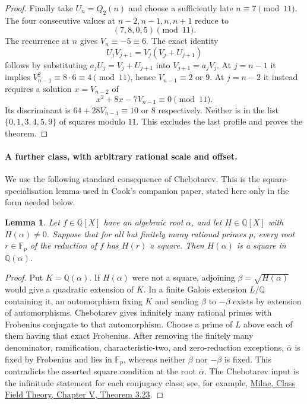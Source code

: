 \documentclass[11pt]{article}
\newtheorem{lemma}{Lemma}
\begin{document}
\begin{proof}
Finally take $U_n=Q_2(n)$ and choose a sufficiently late $n\equiv7\pmod{11}$.
The four consecutive values at $n-2,n-1,n,n+1$ reduce to
\[
 (7,8,0,5)\pmod{11}.
\]
The recurrence at $n$ gives $V_n\equiv-5\equiv6$. The exact identity
\begin{equation}\label{eq:Didentity}
 U_j V_{j+1}=V_j(V_j+U_{j+1})
\end{equation}
follows by substituting $a_jU_j=V_j+U_{j+1}$ into
$V_{j+1}=a_jV_j$. At $j=n-1$ it implies
$V_{n-1}^2\equiv8\cdot6\equiv4\pmod{11}$, hence
$V_{n-1}\equiv2$ or $9$. At $j=n-2$ it instead requires a solution $x=V_{n-2}$ of
\[
 x^2+8x-7V_{n-1}\equiv0\pmod{11}.
\]
Its discriminant is $64+28V_{n-1}\equiv10$ or $8$ respectively.
Neither is in the list $\{0,1,3,4,5,9\}$ of squares modulo $11$.
This excludes the last profile and proves the theorem.
\end{proof}

\paragraph{A further class, with arbitrary rational scale and offset.}
We use the following standard consequence of Chebotarev. This is the
square-specialisation lemma used in Cook's companion paper, stated here
only in the form needed below.

\begin{lemma}\label{lem:specialise}
Let $f\in\mathbb Q[X]$ have an algebraic root $\alpha$, and let
$H\in\mathbb Q[X]$ with $H(\alpha)\ne0$. Suppose that for all but
finitely many rational primes $p$, every root $r\in\mathbb F_p$ of the
reduction of $f$ has $H(r)$ a square. Then $H(\alpha)$ is a square
in $\mathbb Q(\alpha)$.
\end{lemma}
\begin{proof}
Put $K=\mathbb Q(\alpha)$. If $H(\alpha)$ were not a square, adjoining
$\beta=\sqrt{H(\alpha)}$ would give a quadratic extension of $K$.
In a finite Galois extension $L/\mathbb Q$ containing it, an automorphism
fixing $K$ and sending $\beta$ to $-\beta$ exists by extension of
automorphisms. Chebotarev gives infinitely many rational primes with
Frobenius conjugate to that automorphism. Choose a prime of $L$ above
each of them having that exact Frobenius. After removing the finitely
many denominator, ramification, characteristic-two, and zero-reduction
exceptions, $\overline\alpha$ is fixed by Frobenius and lies in
$\mathbb F_p$, whereas neither $\overline\beta$ nor
$-\overline\beta$ is fixed. This contradicts the asserted square
condition at the root $\overline\alpha$.
The Chebotarev input is the infinitude statement for each conjugacy
class; see, for example,
\href{https://www.jmilne.org/math/CourseNotes/CFT.pdf}{Milne,
Class Field Theory, Chapter V, Theorem 3.23}.
\end{proof}
\end{document}
